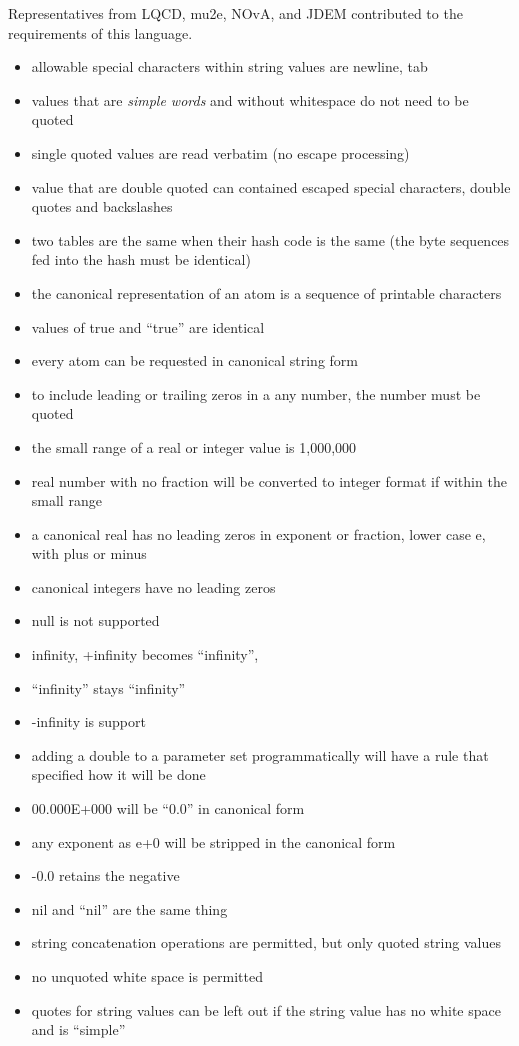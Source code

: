 \documentclass{memarticle}
\begin{document}
Representatives from LQCD, mu2e, NOvA, and JDEM contributed to the requirements 
of this language.

\begin{itemize}
\item allowable special characters within string values are newline, tab
\item values that are \emph{simple words} and without whitespace do not need to be quoted
\item single quoted values are read verbatim (no escape processing)
\item value that are double quoted can contained escaped special characters, double quotes and backslashes
\item two tables are the same when their hash code is the same (the byte sequences fed into the hash must be identical)
\item the canonical representation of an atom is a sequence of printable characters
\item values of true and ``true'' are identical
\item every atom can be requested in canonical string form
\item to include leading or trailing zeros in a any number, the number must be quoted
\item the small range of a real or integer value is 1,000,000
\item real number with no fraction will be converted to integer format if within the small range
\item a canonical real has no leading zeros in exponent or fraction, lower case e, with plus or minus
\item canonical integers have no leading zeros
\item null is not supported
\item infinity, +infinity becomes ``infinity'', 
\item ``infinity'' stays ``infinity''
\item -infinity is support
\item adding a double to a parameter set programmatically will have a rule that specified how it will be done
\item 00.000E+000 will be ``0.0'' in canonical form
\item any exponent as e+0 will be stripped in the canonical form
\item -0.0 retains the negative
\item nil and ``nil'' are the same thing
\item string concatenation operations are permitted, but only quoted string values
\item no unquoted white space is permitted
\item quotes for string values can be left out if the string value has no white space and is ``simple''
\end{itemize}
\end{document}
